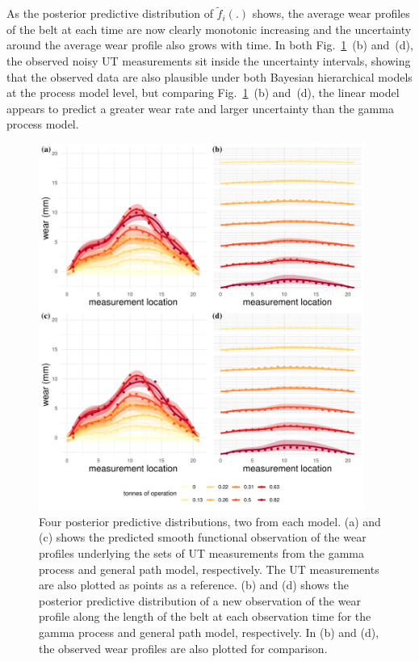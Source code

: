 As the posterior predictive distribution of $\tilde{f}_i(.)$ shows, the average wear profiles of the belt at each time are now clearly monotonic increasing and the uncertainty around the average wear profile also grows with time. In both Fig.~\ref{fig:post-pred-dists-beltwear}~(b) and~(d), the observed noisy UT measurements sit inside the uncertainty intervals, showing that the observed data are also plausible under both Bayesian hierarchical models at the process model level, but comparing Fig.~\ref{fig:post-pred-dists-beltwear}~(b) and~(d), the linear model appears to predict a greater wear rate and larger uncertainty than the gamma process model.

\begin{figure}[tbp]
  \centering
  \includegraphics[width=0.95\textwidth]{figures/ch-6/post_pred_belt_wear.pdf}
  \caption{Four posterior predictive distributions, two from each model. (a) and (c) shows the predicted smooth functional observation of the wear profiles underlying the sets of UT measurements from the gamma process and general path model, respectively. The UT measurements are also plotted as points as a reference. (b) and (d) shows the posterior predictive distribution of a new observation of the wear profile along the length of the belt at each observation time for the gamma process and general path model, respectively. In (b) and (d), the observed wear profiles are also plotted for comparison.}
  \label{fig:post-pred-dists-beltwear}
\end{figure}

